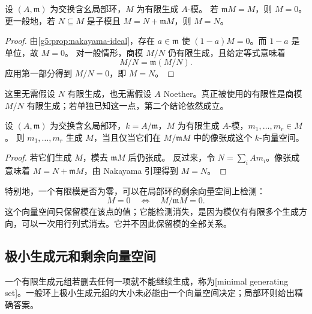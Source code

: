 \begin{theorem}[Nakayama 引理]\label{g5:thm:nakayama-local}
	设 \((A,\mathfrak m)\) 为交换含幺局部环，\(M\) 为有限生成 \(A\)-模。 若 \(\mathfrak mM=M\)，则 \(M=0\)。 更一般地，若 \(N\subseteq M\) 是子模且 \(M=N+\mathfrak mM\)，则 \(M=N\)。
\end{theorem}
\begin{proof}
	由\cref{g5:prop:nakayama-ideal}，存在 \(a\in\mathfrak m\) 使 \((1-a)M=0\)。而 \(1-a\) 是单位，故 \(M=0\)。 对一般情形，商模 \(M/N\) 仍有限生成，且给定等式意味着
	\[
	M/N=\mathfrak m(M/N).
	\]
	应用第一部分得到 \(M/N=0\)，即 \(M=N\)。
\end{proof}

这里无需假设 \(N\) 有限生成，也无需假设 \(A\) Noether。真正被使用的有限性是商模 \(M/N\) 有限生成；若单独已知这一点，第二个结论依然成立。

\begin{corollary}\label{g5:cor:nakayama-generators}
	设 \((A,\mathfrak m)\) 为交换含幺局部环，\(k=A/\mathfrak m\)，\(M\) 为有限生成 \(A\)-模，\(m_1,\ldots,m_r\in M\)。 则 \(m_1,\ldots,m_r\) 生成 \(M\)，当且仅当它们在 \(M/\mathfrak mM\) 中的像张成这个 \(k\)-向量空间。
\end{corollary}
\begin{proof}
	若它们生成 \(M\)，模去 \(\mathfrak mM\) 后仍张成。 反过来，令 \(N=\sum_iAm_i\)。像张成意味着 \(M=N+\mathfrak mM\)，由 Nakayama 引理得到 \(M=N\)。
\end{proof}

特别地，一个有限模是否为零，可以在局部环的剩余向量空间上检测：
\[
	M=0\quad\Longleftrightarrow\quad M/\mathfrak mM=0.
\]
这个向量空间只保留模在该点的值；它能检测消失，是因为模仅有有限多个生成方向，可以一次用行列式消去。它并不因此保留模的全部关系。

\subsection{极小生成元和剩余向量空间}
\label{g5:subsec:0203:03}

一个有限生成元组若删去任何一项就不能继续生成，称为[minimal generating set]。一般环上极小生成元组的大小未必能由一个向量空间决定；局部环则给出精确答案。

